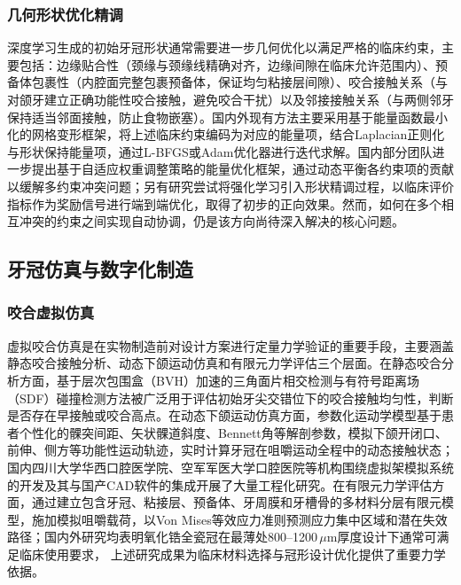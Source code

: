 \documentclass[12pt,hyperref,a4paper,UTF8]{ctexart}
\begin{document}
\subsubsection{几何形状优化精调}

深度学习生成的初始牙冠形状通常需要进一步几何优化以满足严格的临床约束，主要包括：边缘贴合性（颈缘与颈缘线精确对齐，边缘间隙在临床允许范围内）、预备体包裹性（内腔面完整包裹预备体，保证均匀粘接层间隙）、咬合接触关系（与对颌牙建立正确功能性咬合接触，避免咬合干扰）以及邻接接触关系（与两侧邻牙保持适当邻面接触，防止食物嵌塞）。国内外现有方法主要采用基于能量函数最小化的网格变形框架，将上述临床约束编码为对应的能量项，结合Laplacian正则化与形状保持能量项，通过L-BFGS或Adam优化器进行迭代求解\cite{broll2024generative}。国内部分团队进一步提出基于自适应权重调整策略的能量优化框架，通过动态平衡各约束项的贡献以缓解多约束冲突问题；另有研究尝试将强化学习引入形状精调过程，以临床评价指标作为奖励信号进行端到端优化，取得了初步的正向效果。然而，如何在多个相互冲突的约束之间实现自动协调，仍是该方向尚待深入解决的核心问题。

\subsection{牙冠仿真与数字化制造}

\subsubsection{咬合虚拟仿真}

虚拟咬合仿真是在实物制造前对设计方案进行定量力学验证的重要手段，主要涵盖静态咬合接触分析、动态下颌运动仿真和有限元力学评估三个层面。在静态咬合分析方面，基于层次包围盒（BVH）加速的三角面片相交检测与有符号距离场（SDF）碰撞检测方法被广泛用于评估初始牙尖交错位下的咬合接触均匀性，判断是否存在早接触或咬合高点。在动态下颌运动仿真方面，参数化运动学模型基于患者个性化的髁突间距、矢状髁道斜度、Bennett角等解剖参数，模拟下颌开闭口、前伸、侧方等功能性运动轨迹，实时计算牙冠在咀嚼运动全程中的动态接触状态；国内四川大学华西口腔医学院、空军军医大学口腔医院等机构围绕虚拟架模拟系统的开发及其与国产CAD软件的集成开展了大量工程化研究。在有限元力学评估方面，通过建立包含牙冠、粘接层、预备体、牙周膜和牙槽骨的多材料分层有限元模型，施加模拟咀嚼载荷，以Von Mises等效应力准则预测应力集中区域和潜在失效路径；国内外研究均表明氧化锆全瓷冠在最薄处800--1200\,$\mu$m厚度设计下通常可满足临床使用要求，
上述研究成果为临床材料选择与冠形设计优化提供了重要力学依据。

\end{document}
